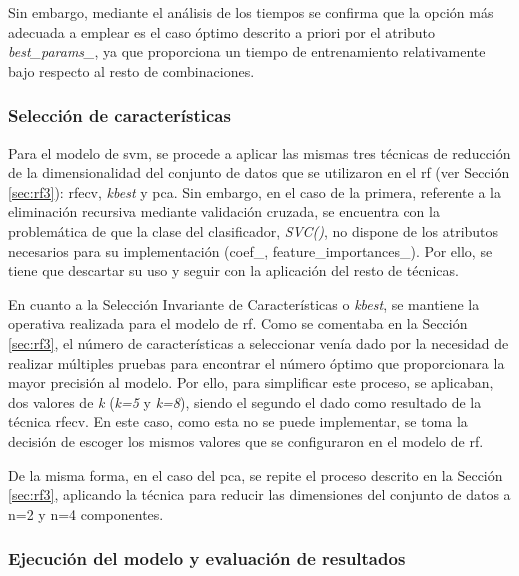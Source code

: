 \pagebreak

Sin embargo, mediante el análisis de los tiempos se confirma que la opción más adecuada a emplear es el caso óptimo descrito a priori por el atributo \textit{best\_params\_}, ya que proporciona un tiempo de entrenamiento relativamente bajo respecto al resto de combinaciones.

\subsubsection{Selección de características}
\label{sec:svm3}

Para el modelo de \gls{svm}, se procede a aplicar las mismas tres técnicas de reducción de la dimensionalidad del conjunto de datos que se utilizaron en el \gls{rf} (ver Sección \ref{sec:rf3}): \gls{rfecv}, \textit{kbest} y \gls{pca}. Sin embargo, en el caso de la primera, referente a la eliminación recursiva mediante validación cruzada, se encuentra con la problemática de que la clase del clasificador, \textit{SVC()}, no dispone de los atributos necesarios para su implementación (coef\_,  feature\_importances\_). Por ello, se tiene que descartar su uso y seguir con la aplicación del resto de técnicas.

\vspace{3mm}

En cuanto a la Selección Invariante de Características o \textit{kbest}, se mantiene la operativa realizada para el modelo de \gls{rf}. Como se comentaba en la Sección \ref{sec:rf3}, el número de características a seleccionar venía dado por la necesidad de realizar múltiples pruebas para encontrar el número óptimo que proporcionara la mayor precisión al modelo. Por ello, para simplificar este proceso, se aplicaban, dos valores de \textit{k} (\textit{k=5} y \textit{k=8}), siendo el segundo el dado como resultado de la técnica \gls{rfecv}. En este caso, como esta no se puede implementar, se toma la decisión de escoger los mismos valores que se configuraron en el modelo de \gls{rf}.

\vspace{3mm}

De la misma forma, en el caso del \gls{pca}, se repite el proceso descrito en la Sección \ref{sec:rf3}, aplicando la técnica para reducir las dimensiones del conjunto de datos a n=2 y n=4 componentes. 

\subsubsection{Ejecución del modelo y evaluación de resultados}
\label{sec:svm4}

